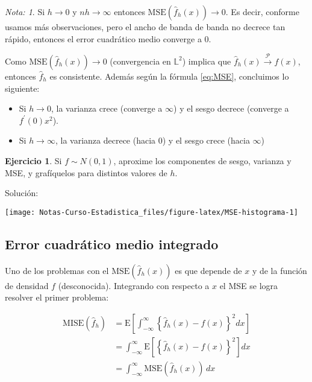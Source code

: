 \documentclass[
  12pt,
]{book}
\providecommand{\tightlist}{%
  \setlength{\itemsep}{0pt}\setlength{\parskip}{0pt}}
\theoremstyle{definition}
\theoremstyle{definition}
\theoremstyle{definition}
\newtheorem{exercise}{Ejercicio}[chapter]
\theoremstyle{definition}
\theoremstyle{remark}
\newtheorem*{remark}{Nota: }
\begin{document}
\begin{remark}

Si \(h \to 0\) y \(nh \to \infty\) entonces \(\mathrm{MSE}\left( \hat{f}_h(x)\right) \to 0\). Es decir, conforme usamos más observaciones, pero el ancho de banda de banda no decrece tan rápido, entonces el error cuadrático medio converge a 0.

Como \(\mathrm{MSE}\left( \hat{f}_h(x)\right) \to 0\) (convergencia en \(\mathbb{L}^2\)) implica que \(\hat{f}_h(x) \stackrel{\mathcal{P}}{\to} f(x)\), entonces \(\hat{f}_h\) es consistente. Además según la fórmula \eqref{eq:MSE}, concluimos lo siguiente:

\begin{itemize}
\tightlist
\item
  Si \(h\to 0\), la varianza crece (converge a \(\infty\)) y el sesgo
  decrece (converge a \(f^\prime (0)x^2\)).
\item
  Si \(h\to \infty\), la varianza decrece (hacia 0) y el sesgo crece
  (hacia \(\infty\))
\end{itemize}

\end{remark}

\begin{exercise}
\protect\hypertarget{exr:unnamed-chunk-8}{}\label{exr:unnamed-chunk-8}Si \(f\sim N(0,1)\), aproxime los componentes de sesgo, varianza y MSE, y grafíquelos para distintos valores de \(h\).
\end{exercise}

Solución:

\begin{center}\texttt{[image: Notas-Curso-Estadistica\_files/figure-latex/MSE-histograma-1]} \end{center}

\hypertarget{error-cuadruxe1tico-medio-integrado}{%
\subsection{Error cuadrático medio integrado}\label{error-cuadruxe1tico-medio-integrado}}

Uno de los problemas con el \(\mathrm{MSE}\left( \hat{f}_h(x)\right)\) es que depende de \(x\) y de la función de densidad \(f\) (desconocida). Integrando con respecto a \(x\) el MSE se logra resolver el primer problema:

\begin{align*}
\mathrm{MISE}\left(  \hat{f}_h\right)
& = \mathrm{E}\left[
\int_{ -\infty}^{\infty} \left\{
\hat{f}_h(x) - f(x)
\right\}^2 dx
\right]                                                       \\
& = \int_{ -\infty}^{\infty} \mathrm{E}\left[
\left\{
\hat{f}_h(x) - f(x)
\right\}^2
\right] dx                                                    \\
& = \int_{ -\infty}^{\infty}\mathrm{MSE}(\hat{f}_h(x)) \, dx
\end{align*}
\end{document}
